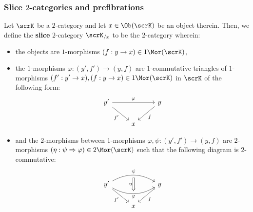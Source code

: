        \subsubsection{Slice \texorpdfstring{$2$}{}-categories and prefibrations}
            \begin{definition} \label{def: slice_2_categories}
                Let $\scrK$ be a $2$-category and let $x \in \Ob(\scrK)$ be an object therein. Then, we define the \textbf{slice} $2$-category $\scrK_{/x}$ to be the $2$-category wherein:
                    \begin{itemize}
                        \item the objects are $1$-morphisms $(f: y \to x) \in 1\-\Mor(\scrK)$,
                        \item the $1$-morphisms $\varphi: (y', f') \to (y, f)$ are $1$-commutative triangles of $1$-morphisms $(f': y' \to x), (f: y \to x) \in 1\-\Mor(\scrK)$ in $\scrK$ of the following form:
                            $$
                                \begin{tikzcd}
                                	{y'} && y \\
                                	& x
                                	\arrow["\varphi", from=1-1, to=1-3]
                                	\arrow["{f'}"', from=1-1, to=2-2]
                                	\arrow["f", from=1-3, to=2-2]
                                \end{tikzcd}
                            $$
                        \item and the $2$-morphisms between $1$-morphisms $\varphi, \psi: (y', f') \to (y, f)$ are $2$-morphisms $(\eta: \psi \Rightarrow \varphi) \in 2\-\Mor(\scrK)$ such that the following diagram is $2$-commutative:
                            $$
                                \begin{tikzcd}
                                	{y'} && y \\
                                	& x
                                	\arrow["{f'}"', from=1-1, to=2-2]
                                	\arrow["f", from=1-3, to=2-2]
                                	\arrow[""{name=0, anchor=center, inner sep=0}, "\varphi"', bend right, from=1-1, to=1-3]
                                	\arrow[""{name=1, anchor=center, inner sep=0}, "\psi", bend left, from=1-1, to=1-3]
                                	\arrow["\eta"', shorten <=3pt, shorten >=3pt, Rightarrow, from=1, to=0]
                                \end{tikzcd}
                            $$
                    \end{itemize}
            \end{definition}
